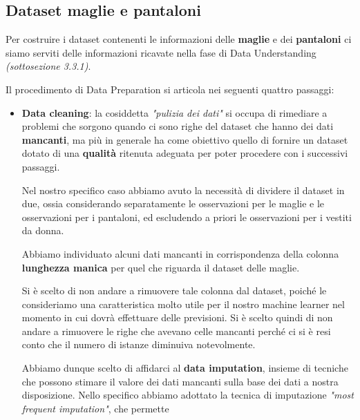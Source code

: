 \documentclass[a4paper, 11pt, oneside]{report}
\begin{document}
                \subsection{Dataset maglie e pantaloni}
                Per costruire i dataset contenenti le informazioni delle \textbf{maglie} e dei \textbf{pantaloni} ci siamo serviti delle
                informazioni ricavate nella fase di Data Understanding \textit{(sottosezione 3.3.1)}.
                \\
                \par \noindent Il procedimento di Data Preparation si articola nei seguenti quattro passaggi:
                \begin{itemize}
                    \item \textbf{Data cleaning}: la cosiddetta \textit{"pulizia dei dati"} si occupa di
                    rimediare a problemi che sorgono quando ci sono righe del dataset che hanno dei dati \textbf{mancanti}, ma più
                    in generale ha come obiettivo quello di fornire un dataset dotato di una \textbf{qualità} ritenuta adeguata
                    per poter procedere con i successivi passaggi.
                    \par \noindent Nel nostro specifico caso abbiamo avuto la necessità di dividere il dataset \cite{6} in
                    due, ossia considerando separatamente le osservazioni per le maglie e le osservazioni per i pantaloni,
                    ed escludendo a priori le osservazioni per i vestiti da donna.
                    \par \noindent Abbiamo individuato alcuni dati mancanti in corrispondenza della
                    colonna \textbf{lunghezza manica} per quel che riguarda il dataset delle maglie.
                    \par \noindent Si è scelto di non andare a rimuovere tale colonna dal dataset, poiché le consideriamo una caratteristica
                    molto utile per il nostro machine learner nel momento in cui dovrà effettuare delle previsioni.
                    Si è scelto quindi di non andare a rimuovere le righe che avevano celle mancanti
                    perché ci si è resi conto che il numero di istanze diminuiva notevolmente.
                    \par \noindent Abbiamo dunque scelto di affidarci al \textbf{data imputation}, insieme di tecniche che
                    possono stimare il valore dei dati mancanti sulla base dei dati a nostra disposizione.
                    Nello specifico abbiamo adottato la tecnica di imputazione \textit{"most frequent imputation"}, che permette

\end{itemize}
\end{document}

